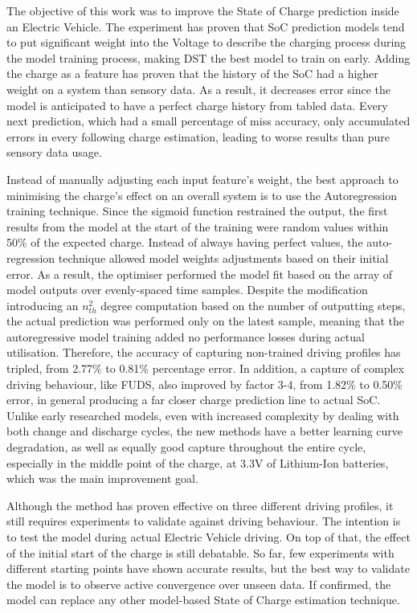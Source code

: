 {The objective of this work was to improve the State of Charge prediction inside an Electric Vehicle.}
The experiment has proven that SoC prediction models tend to put significant weight into the Voltage to describe the charging process during the model training process, making DST the best model to train on early.
Adding the charge as a feature has proven that the history of the SoC had a higher weight on a system than sensory data.
As a result, it decreases error since the model is anticipated to have a perfect charge history from tabled data.
Every next prediction, which had a small percentage of miss accuracy, only accumulated errors in every following charge estimation, leading to worse results than pure sensory data usage.

%
%
Instead of manually adjusting each input feature's weight, the best approach to minimising the charge's effect on an overall system is to use the Autoregression training technique. 
Since the sigmoid function restrained the output, the first results from the model at the start of the training were random values within 50\% of the expected charge.
Instead of always having perfect values, the auto-regression technique allowed model weights adjustments based on their initial error.
As a result, the optimiser performed the model fit based on the array of model outputs over evenly-spaced time samples.
Despite the modification introducing an $n_{th}^{2}$ degree computation based on the number of outputting steps, the actual prediction was performed only on the latest sample, meaning that the autoregressive model training added no performance losses during actual utilisation.
Therefore, the accuracy of capturing non-trained driving profiles has tripled, from 2.77\% to 0.81\% percentage error.
In addition, a capture of complex driving behaviour, like FUDS, also improved by factor 3-4, from 1.82\% to 0.50\% error, in general producing a far closer charge prediction line to actual SoC.
Unlike early researched models, even with increased complexity by dealing with both change and discharge cycles, the new methods have a better learning curve degradation, as well as equally good capture throughout the entire cycle, especially in the middle point of the charge, at 3.3V of Lithium-Ion batteries, which was the main improvement goal.

%
%
Although the method has proven effective on three different driving profiles, it still requires experiments to validate against driving behaviour.
The intention is to test the model during actual Electric Vehicle driving.
On top of that, the effect of the initial start of the charge is still debatable.
So far, few experiments with different starting points have shown accurate results, but the best way to validate the model is to observe active convergence over unseen data.
If confirmed, the model can replace any other model-based State of Charge estimation technique.
